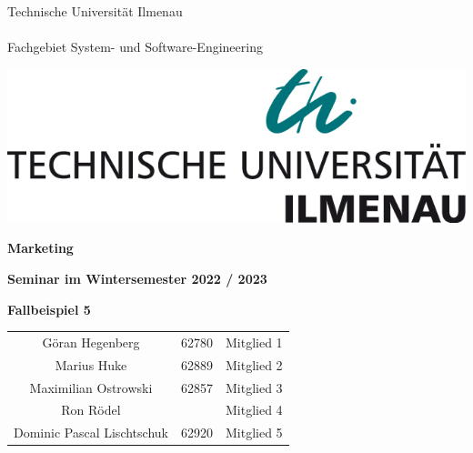 \begin{titlepage}
    
    \begin{minipage}[b]{0.625\textwidth}
      Technische Universität Ilmenau\\
      \\
      Fachgebiet System- und Software-Engineering
    \end{minipage}%
    \hfill
    \begin{minipage}[b]{0.375\textwidth}
      \begin{flushright}
        \includegraphics[width=\textwidth]{tu_logo.jpg}
      \end{flushright}
    \end{minipage}
    \vspace*{12\baselineskip}
    
    \begin{centering}
    {\huge \textbf{Marketing}}\\
    \vspace*{1\baselineskip}
    
    {\large \textbf{Seminar im Wintersemester 2022 / 2023}}\\
    \vspace*{9\baselineskip}
    
    {\LARGE \textbf{Fallbeispiel 5}}\\
    \vspace*{1\baselineskip}
    
    \begin{center}
        \large
        \begin{tabular}{ccc}
            Göran Hegenberg & 62780 & Mitglied 1 \\
            Marius Huke & 62889 & Mitglied 2 \\
            Maximilian Ostrowski & 62857 & Mitglied 3 \\
            Ron Rödel & & Mitglied 4 \\
            Dominic Pascal Lischtschuk & 62920 & Mitglied 5 \\
        \end{tabular}
    \end{center}
    \end{centering}
    
    \restoregeometry
    \end{titlepage}
    
    
    
    \tableofcontents
    \thispagestyle{empty} %
    \pagebreak %